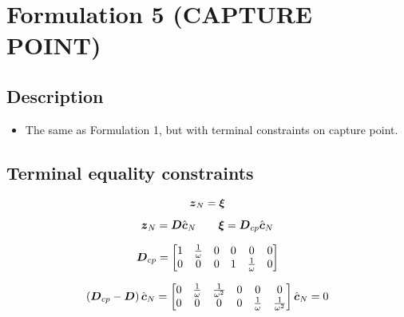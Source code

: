 \section{Formulation 5 (CAPTURE POINT)}\label{sec.form05}


\subsection{Description}
\begin{itemize}
    \item The same as Formulation 1, but with terminal constraints on capture point.
\end{itemize}



\subsection{Terminal equality constraints}

\begin{equation*}
    \mbox{\boldmath $z$}_N = \mbox{\boldmath $\xi$}
\end{equation*}

\begin{equation*}
    \mbox{\boldmath $z$}_N = \mbox{\boldmath $D$}\hat{\mbox{\boldmath $c$}}_N
    \quad\quad
    \mbox{\boldmath $\xi$} = \mbox{\boldmath $D$}_{cp}\hat{\mbox{\boldmath $c$}}_N
\end{equation*}

\begin{equation*}
    \mbox{\boldmath $D$}_{cp} = 
    \begin{bmatrix}
        1   &   \frac{1}{\omega}    &   0   &   0   &   0                   &   0\\
        0   &   0                   &   0   &   1   &   \frac{1}{\omega}    &   0\\
    \end{bmatrix}
\end{equation*}

\begin{equation*}
    \left(\mbox{\boldmath $D$}_{cp} - \mbox{\boldmath $D$}\right)\hat{\mbox{\boldmath $c$}}_N = 
    \begin{bmatrix}
        0   &   \frac{1}{\omega}    &   \frac{1}{\omega^2}  &   0   &   0                   &   0\\
        0   &   0                   &   0                   &   0   &   \frac{1}{\omega}    &   \frac{1}{\omega^2}\\
    \end{bmatrix}
    \hat{\mbox{\boldmath $c$}}_N = 0
\end{equation*}

